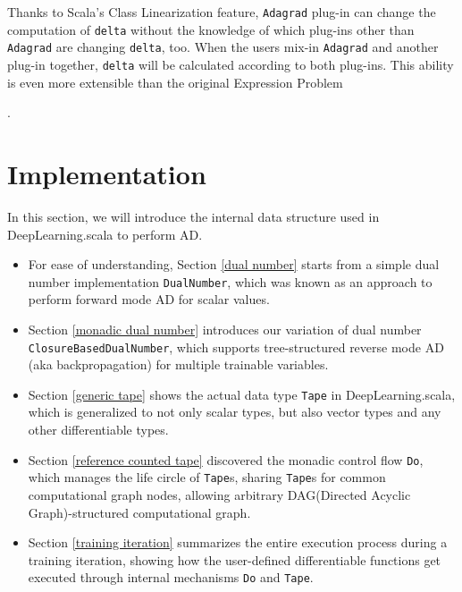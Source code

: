 Thanks to Scala's Class Linearization \cite{odersky2017scala} feature, \lstinline{Adagrad} \gls{plug-in} can change the computation of \lstinline{delta} without the knowledge of which \glspl{plug-in} other than \lstinline{Adagrad} are changing \lstinline{delta}, too. When the users mix-in \lstinline{Adagrad} and another plug-in together, \lstinline{delta} will be calculated according to both plug-ins. This ability is even more extensible than the original Expression Problem\begin{anonsuppress} \cite{yang2017expression}
\end{anonsuppress}
.

\section{Implementation}
\label{implementation}

In this section, we will introduce the internal data structure used in DeepLearning.scala to perform AD.

\begin{itemize}

  \item For ease of understanding, Section \ref{dual number} starts from a simple dual number implementation \lstinline{DualNumber}, which was known as an approach to perform forward mode AD for scalar values.
  
  \item Section \ref{monadic dual number} introduces our variation of dual number \lstinline{ClosureBasedDualNumber}, which supports tree-structured reverse mode AD (aka backpropagation) for multiple \glspl{trainable variable}.

  \item Section \ref{generic tape} shows the actual data type \lstinline{Tape} in DeepLearning.scala, which is generalized to not only scalar types, but also vector types and any other differentiable types.

  \item Section \ref{reference counted tape} discovered the monadic control flow \lstinline{Do}, which manages the life circle of \lstinline{Tape}s, sharing \lstinline{Tape}s for common computational graph nodes, allowing arbitrary DAG(Directed Acyclic Graph)-structured computational graph.

  \item Section \ref{training iteration} summarizes the entire execution process during a training iteration, showing how the user-defined \glspl{differentiable function} get executed through internal mechanisms \lstinline{Do} and \lstinline{Tape}.

\end{itemize}

